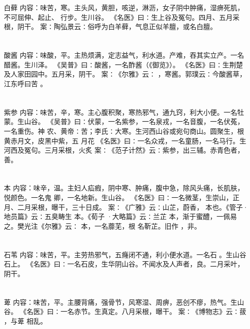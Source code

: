 \documentclass[12pt,UTF8]{ctexbook}
\begin{document}
\section{}白藓
内容：味苦，寒。主头风，黄胆，咳逆，淋沥，女子阴中肿痛，湿痹死肌，不可屈伸、起止、 
行步。生川谷。 
《名医》曰∶生上谷及冤句。四月、五月采根，阴干。 
案∶陶弘景云∶俗呼为白羊藓，气息正似羊膻，或名白膻。 


\section{}酸酱
内容：味酸，平。主热烦满，定志益气，利水道。产难，吞其实立产。一名醋酱。生川泽。 
《吴普》曰∶酸酱，一名酢酱（《御览》）。 
《名医》曰∶生荆楚及人家田园中。五月采，阴干。 
案∶《尔雅》云∶ ，寒酱。郭璞云∶今酸酱草，江东呼曰苦 。 


\section{}紫参
内容：味苦，辛，寒。主心腹积聚，寒热邪气，通九窍，利大小便。一名牡蒙。生山谷。 
《吴普》曰∶伏蒙，一名紫参，一名泉戎，一名音腹，一名伏菟，一名重伤。神 
农、黄帝∶苦；李氏∶大寒。生河西山谷或宛句商山。圆聚生，根黄赤月文，皮黑中紫，五 
月花 
《名医》曰∶一名众戎，一名童肠，一名马行。生河西及冤句。三月采根，火炙 
案∶《范子计然》云∶紫参，出三辅。赤青色者，善。 


\section{}本
内容：味辛，温。主妇人疝瘕，阴中寒、肿痛，腹中急，除风头痛，长肌肤，悦颜色。一名鬼 
卿，一名地新。生山谷。 
《名医》曰∶一名微茎，生崇山，正月、二月采根，曝干，三十日成。 
案∶《广雅》云∶山芷，蔚香， 本也。《管子·地员篇》云∶五臭畴生 本。《荀子 
·大略篇》云∶兰芷 本，渐于蜜醴，一佩易之。樊光注《尔雅》云∶ 本，一名蘼芜，根 
名靳芷。旧作 ，非。 


\section{}石苇
内容：味苦，平。主劳热邪气，五癃闭不通，利小便水道。一名石 。生山谷石上。 
《名医》曰∶一名石皮，生华阴山谷。不闻水及人声者，良。二月采叶，阴干。 


\section{}萆
内容：味苦，平。主腰背痛，强骨节，风寒湿、周痹，恶创不瘳，热气。生山谷。 
《名医》曰∶一名赤节。生真定。八月采根，曝干。 
案∶《博物志》云∶菝 ，与萆 相乱。 
\end{document}
